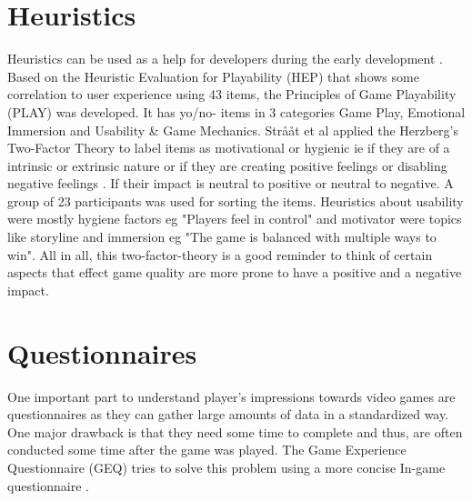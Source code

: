 \section{Heuristics}
Heuristics can be used as a help for developers during the early development \cite{desurvire2009game}. Based on the Heuristic Evaluation for Playability (HEP) that shows some correlation to user experience \cite{desurvire2004using} using 43 items, the Principles of Game Playability (PLAY) was developed. It has  yo/no- items in 3 categories  Game Play, Emotional Immersion and Usability \& Game Mechanics.
Strååt et al \cite{straaaat2015applying} applied the Herzberg’s Two-Factor Theory to label items as motivational or hygienic ie if they are of a intrinsic or extrinsic nature or if they are creating positive feelings or disabling negative feelings \cite{alshmemri2017herzberg}. If their impact is neutral to positive or neutral to negative. A group of 23 participants was used for sorting the items. Heuristics about usability were mostly hygiene factors eg "Players feel in control" and motivator were topics like storyline and immersion eg "The game is balanced with multiple ways to win". All in all, this two-factor-theory is a good reminder to think of certain aspects that effect game quality are more prone to have a positive and a negative impact.


\section{Questionnaires}
One important part to understand player's impressions towards video games are questionnaires as they can gather large amounts of data in a standardized way. One major drawback is that they need some time to complete and thus, are often conducted some time after the game was played. The Game Experience Questionnaire (GEQ) tries to solve this problem using a more concise In-game questionnaire \cite{poels2007game}. 




